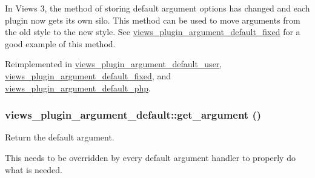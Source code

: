 In Views 3, the method of storing default argument options has changed and each plugin now gets its own silo. This method can be used to move arguments from the old style to the new style. See \hyperlink{classviews__plugin__argument__default__fixed}{views\_\-plugin\_\-argument\_\-default\_\-fixed} for a good example of this method. 

Reimplemented in \hyperlink{classviews__plugin__argument__default__user_ae184e4a33635d3e1e29cdbbfbb4c0c72}{views\_\-plugin\_\-argument\_\-default\_\-user}, \hyperlink{classviews__plugin__argument__default__fixed_a69ba4df78a331a961cc021e3b1f662b7}{views\_\-plugin\_\-argument\_\-default\_\-fixed}, and \hyperlink{classviews__plugin__argument__default__php_ab95fe7eaef0011eef60a382224095ede}{views\_\-plugin\_\-argument\_\-default\_\-php}.\hypertarget{classviews__plugin__argument__default_a8e67864f4a1ce20b12bc82afe1acd255}{
\subsubsection[{get\_\-argument}]{\setlength{\rightskip}{0pt plus 5cm}views\_\-plugin\_\-argument\_\-default::get\_\-argument ()}}
\label{classviews__plugin__argument__default_a8e67864f4a1ce20b12bc82afe1acd255}
Return the default argument.

This needs to be overridden by every default argument handler to properly do what is needed. 

